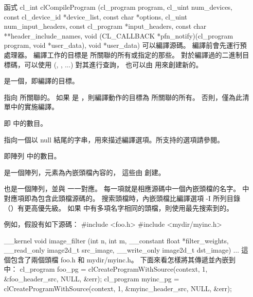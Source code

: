 函式
\startclc
cl_int clCompileProgram (cl_program program,
			cl_uint num_devices,
			const cl_device_id *device_list,
			const char *options,
			cl_uint num_input_headers,
			const cl_program *input_headers,
			const char **header_include_names,
			void (CL_CALLBACK *pfn_notify)(cl_program program,
					void *user_data),
			void *user_data)
\stopclc
可以編譯源碼。
編譯前會先運行預處理器。
編譯工作的目標是  所關聯的所有或指定的那些。
對於編譯過的二進制目標碼，可以使用 (, , ...) 對其進行查詢，
也可以由  用來創建新的。

 是一個，即編譯的目標。

 指向  所關聯的。
如果  是 ，則編譯動作的目標為  所關聯的所有。
否則，僅為此清單中的實施編譯。

 即  中的數目。

 指向一個以 null 結尾的字串，用來描述編譯選項。所支持的選項請參閱。

 即陣列  中的數目。

 是一個陣列，元素為內嵌頭檔內容的，
這些由  創建。

 也是一個陣列，並與  一一對應。
每一項就是相應源碼中一個內嵌頭檔的名字。
  中對應項即為包含此頭檔源碼的。
搜索頭檔時，內嵌頭檔比編譯選項 -I 所列目錄（）有更高優先級。
如果  中有多項名字相同的頭檔，則使用最先搜索到的。

例如，假設有如下源碼：
\startclc
#include <foo.h>
#include <mydir/myinc.h>

__kernel void image_filter (int n, int m,
			__constant float *filter_weights,
			__read_only image2d_t src_image,
			__write_only image2d_t dst_image)
{
	...
}
\stopclc
這個包含了兩個頭檔 foo.h 和 mydir/myinc.h。
下面來看怎樣將其傳遞並內嵌到中：
\startclc
cl_program foo_pg = clCreateProgramWithSource(context,
				1, &foo_header_src, NULL, &err);
cl_program myinc_pg = clCreateProgramWithSource(context,
				1, &myinc_header_src, NULL, &err);

